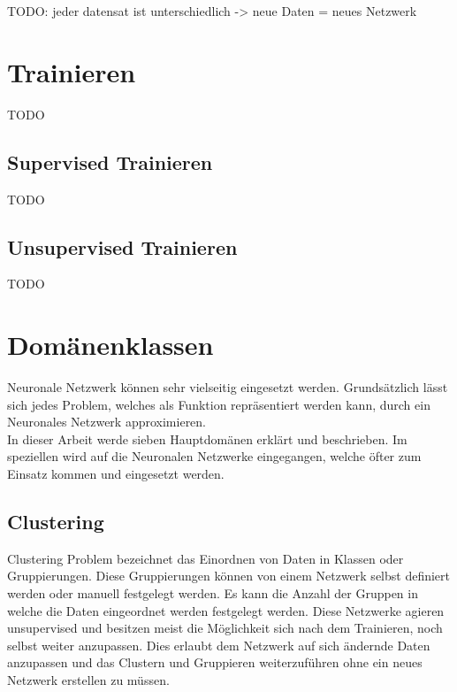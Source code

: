 TODO: jeder datensat ist unterschiedlich -> neue Daten = neues Netzwerk

\section{Trainieren}

TODO

\subsection{Supervised Trainieren}

TODO

\subsection{Unsupervised Trainieren}

TODO

\section{Domänenklassen}
\label{sec:Domänenklassen}

Neuronale Netzwerk können sehr vielseitig eingesetzt werden. 
Grundsätzlich lässt sich jedes Problem, welches als Funktion repräsentiert werden kann, durch ein Neuronales Netzwerk approximieren. \\

In dieser Arbeit werde sieben Hauptdomänen erklärt und beschrieben.%
Im speziellen wird auf die Neuronalen Netzwerke eingegangen, welche öfter zum Einsatz kommen und eingesetzt werden.

\subsection{Clustering}
\label{subsec:Clustering}

Clustering Problem bezeichnet das Einordnen von Daten in Klassen oder Gruppierungen. 
Diese Gruppierungen können von einem Netzwerk selbst definiert werden oder manuell festgelegt werden. 
Es kann die Anzahl der Gruppen in welche die Daten eingeordnet werden festgelegt werden. 
Diese Netzwerke agieren unsupervised und besitzen meist die Möglichkeit sich nach dem Trainieren, noch selbst weiter anzupassen. 
Dies erlaubt dem Netzwerk auf sich ändernde Daten anzupassen und das Clustern und Gruppieren weiterzuführen ohne ein neues Netzwerk erstellen zu müssen.

